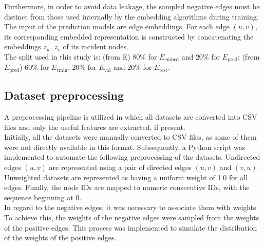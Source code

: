 Furthermore, in order to avoid data leakage, the sampled negative edges must be distinct from those used internally by the embedding algorithms during training.
\\\newline
The input of the prediction models are edge embeddings.
For each edge $(u,v)$, its corresponding embedded representation is constructed by concatenating the embeddings $z_u$, $z_v$ of its incident nodes.
\\\newline
The split used in this study is: (from E) $80\%$ for $E_{\text{embed}}$ and $20\%$  for $E_{\text{pred}}$; (from $E_{\text{pred}}$) $60\%$ for $E_{\text{train}}$, $20\%$  for $E_{\text{val}}$ and $20\%$  for $E_{\text{test}}$.

\subsection{Dataset preprocessing}
A preprocessing pipeline is utilized in which all datasets are converted into CSV files and only the useful features are extracted, if present.
\\\newline
Initially, all the datasets were manually converted to CSV files, as some of them were not directly available in this format.
Subsequently, a Python script was implemented to automate the following preprocessing of the datasets.
Undirected edges $(u, v)$ are represented using a pair of directed edges $(u, v)$ and $(v, u)$.
Unweighted datasets are represented as having a uniform weight of 1.0 for all edges. 
Finally, the node IDs are mapped to numeric consecutive IDs, with the sequence beginning at 0.
\\\newline
In regard to the negative edges, it was necessary to associate them with weights.
To achieve this, the weights of the negative edges were sampled from the weights of the positive edges. 
This process was implemented to simulate the distribution of the weights of the positive edges.

